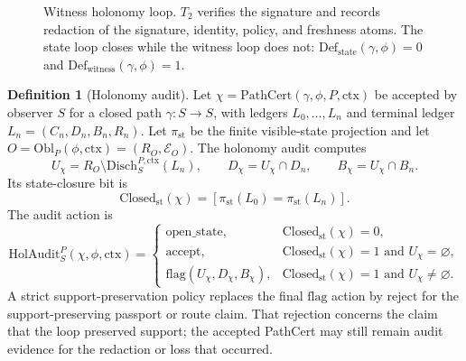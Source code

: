\documentclass[11pt,twoside]{article}
\theoremstyle{definition}
\newtheorem{definition}[theorem]{Definition}
\newcommand{\Obl}{\mathrm{Obl}}
\newcommand{\PathCert}{\mathrm{PathCert}}
\newcommand{\Disch}{\mathrm{Disch}}
\newcommand{\Def}{\mathrm{Def}}
\newcommand{\ctx}{\mathrm{ctx}}
\begin{document}
\begin{figure}[ht]
\centering
{}
\caption{Witness holonomy loop. $T_2$ verifies the signature and records redaction of the signature, identity, policy, and freshness atoms. The state loop closes while the witness loop does not: $\Def_{\mathrm{state}}(\gamma,\phi)=0$ and $\Def_{\mathrm{witness}}(\gamma,\phi)=1$.}
\label{fig:witness-holonomy}
\end{figure}

\begin{definition}[Holonomy audit]
\label{def:holonomy-audit}
Let $\chi=\PathCert(\gamma,\phi,P,\ctx)$ be accepted by observer $S$ for a
closed path $\gamma:S\to S$, with ledgers $L_0,\ldots,L_n$ and terminal ledger
$L_n=(C_n,D_n,B_n,R_n)$. Let $\pi_{\mathrm{st}}$ be the finite visible-state
projection and let $O=\Obl_P(\phi,\ctx)=(R_O,\mathcal E_O)$. The holonomy audit
computes
\[
  U_\chi = R_O\setminus \Disch_S^{P,\ctx}(L_n),
  \qquad
  D_\chi = U_\chi\cap D_n,
  \qquad
  B_\chi = U_\chi\cap B_n.
\]
Its state-closure bit is
\[
  \mathrm{Closed}_{\mathrm{st}}(\chi)
  =
  [\pi_{\mathrm{st}}(L_0)=\pi_{\mathrm{st}}(L_n)].
\]
The audit action is
\[
  \mathrm{HolAudit}_S^P(\chi,\phi,\ctx)=
  \begin{cases}
    \mathrm{open\_state}, & \mathrm{Closed}_{\mathrm{st}}(\chi)=0,\\
    \mathrm{accept}, & \mathrm{Closed}_{\mathrm{st}}(\chi)=1
      \text{ and } U_\chi=\varnothing,\\
    \mathrm{flag}(U_\chi,D_\chi,B_\chi), &
      \mathrm{Closed}_{\mathrm{st}}(\chi)=1 \text{ and } U_\chi\neq\varnothing.
  \end{cases}
\]
A strict support-preservation policy replaces the final
$\mathrm{flag}$ action by $\mathrm{reject}$ for the support-preserving passport
or route claim. That rejection concerns the claim that the loop preserved
support; the accepted PathCert may still remain audit evidence for the redaction
or loss that occurred.
\end{definition}
\end{document}
